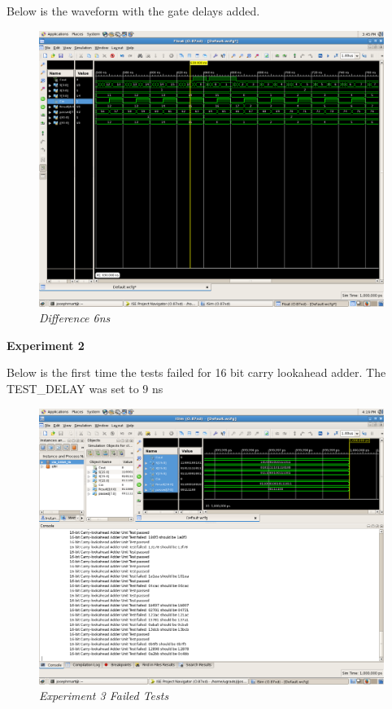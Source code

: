 \documentclass[a4paper,12pt]{article}
\begin{document}
\newpage
  Below is the waveform with the gate delays added.
  
\begin{figure}[h]
  \begin{center}
    \includegraphics[scale=.2]{Exp_1_difference_6ns.png}
    \caption{\textit{Difference 6ns}}
  \end{center}
\end{figure}

\textbf{Experiment 2}

  Below is the first time the tests failed for 16 bit carry lookahead adder. The TEST\_DELAY was set to $9$ ns

\begin{figure}[h]
  \begin{center}
    \includegraphics[scale=.15]{exp3_failed_tests.png}
    \caption{\textit{Experiment 3 Failed Tests}}
  \end{center}
\end{figure}
\end{document}
